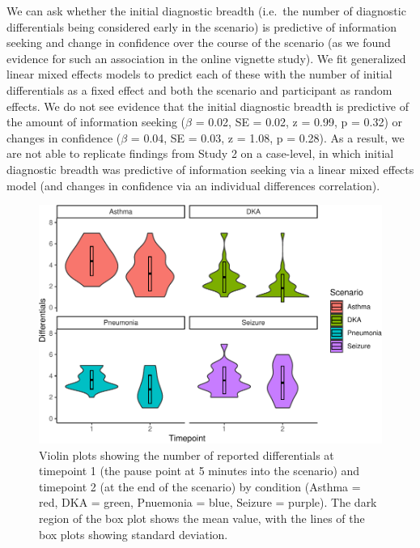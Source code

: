 \documentclass[a4paper, nobind]{templates/ociamthesis}
\begin{document}
\hfill\break
We can ask whether the initial diagnostic breadth (i.e.~the number of diagnostic differentials being considered early in the scenario) is predictive of information seeking and change in confidence over the course of the scenario (as we found evidence for such an association in the online vignette study). We fit generalized linear mixed effects models to predict each of these with the number of initial differentials as a fixed effect and both the scenario and participant as random effects. We do not see evidence that the initial diagnostic breadth is predictive of the amount of information seeking (\(\beta\) = 0.02, SE = 0.02, z = 0.99, p = 0.32) or changes in confidence (\(\beta\) = 0.04, SE = 0.03, z = 1.08, p = 0.28). As a result, we are not able to replicate findings from Study 2 on a case-level, in which initial diagnostic breadth was predictive of information seeking via a linear mixed effects model (and changes in confidence via an individual differences correlation).

\begin{figure}[H]

{\centering \includegraphics[width=1\linewidth]{_main_files/figure-latex/diagtime-1} 

}

\caption[VR Study: Differentials by Timepoint and Scenario (Violin Plots)]{Violin plots showing the number of reported differentials at timepoint 1 (the pause point at 5 minutes into the scenario) and timepoint 2 (at the end of the scenario) by condition (Asthma = red, DKA = green, Pnuemonia = blue, Seizure = purple). The dark region of the box plot shows the mean value, with the lines of the box plots showing standard deviation.}\label{fig:diagtime}
\end{figure}
\end{document}
